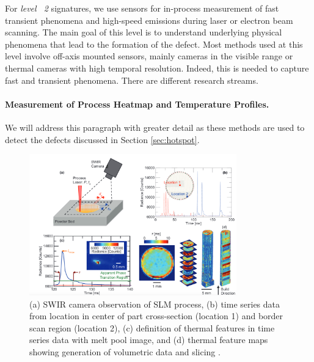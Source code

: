 For \emph{level ~2} signatures, we use sensors for in-process measurement of fast transient phenomena and high-speed emissions during laser or electron beam scanning. The main goal of this level is to understand underlying physical phenomena that lead to the formation of the defect. Most methods used at this level involve off-axis mounted sensors, mainly cameras in the visible range or thermal cameras with high temporal resolution. Indeed, this is needed to capture fast and transient phenomena. There are different research streams.
\paragraph{Measurement of Process Heatmap and Temperature Profiles.} We will address this paragraph with greater detail as these methods are used to detect the defects discussed in Section \ref{sec:hotspot}.
\begin{figure}
    \centering
    \includegraphics[width=0.8\textwidth]{Images/voxel.png}
    \caption[Example of voxel thermic reconstruction.]{(a) SWIR camera observation of SLM process, (b) time series data from location in center of part cross-section (location 1) and border scan region (location 2), (c) definition of thermal features in time series data with melt pool image, and (d) thermal feature maps showing generation of volumetric data and slicing \cite{lough_-situ_2019}.}
    \label{fig:voxel}
\end{figure}
